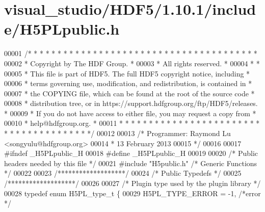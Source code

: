\hypertarget{visual__studio_2_h_d_f5_21_810_81_2include_2_h5_p_lpublic_8h_source}{}\section{visual\+\_\+studio/\+H\+D\+F5/1.10.1/include/\+H5\+P\+Lpublic.h}
\label{visual__studio_2_h_d_f5_21_810_81_2include_2_h5_p_lpublic_8h_source}

\begin{DoxyCode}
00001 \textcolor{comment}{/* * * * * * * * * * * * * * * * * * * * * * * * * * * * * * * * * * * * * * *}
00002 \textcolor{comment}{ * Copyright by The HDF Group.                                               *}
00003 \textcolor{comment}{ * All rights reserved.                                                      *}
00004 \textcolor{comment}{ *                                                                           *}
00005 \textcolor{comment}{ * This file is part of HDF5. The full HDF5 copyright notice, including      *}
00006 \textcolor{comment}{ * terms governing use, modification, and redistribution, is contained in    *}
00007 \textcolor{comment}{ * the COPYING file, which can be found at the root of the source code       *}
00008 \textcolor{comment}{ * distribution tree, or in https://support.hdfgroup.org/ftp/HDF5/releases.  *}
00009 \textcolor{comment}{ * If you do not have access to either file, you may request a copy from     *}
00010 \textcolor{comment}{ * help@hdfgroup.org.                                                        *}
00011 \textcolor{comment}{ * * * * * * * * * * * * * * * * * * * * * * * * * * * * * * * * * * * * * * */}
00012 
00013 \textcolor{comment}{/* Programmer:  Raymond Lu <songyulu@hdfgroup.org>}
00014 \textcolor{comment}{ *              13 February 2013}
00015 \textcolor{comment}{ */}
00016 
00017 \textcolor{preprocessor}{#ifndef \_H5PLpublic\_H}
00018 \textcolor{preprocessor}{#define \_H5PLpublic\_H}
00019 
00020 \textcolor{comment}{/* Public headers needed by this file */}
00021 \textcolor{preprocessor}{#include "H5public.h"}          \textcolor{comment}{/* Generic Functions                    */}
00022 
00023 \textcolor{comment}{/*******************/}
00024 \textcolor{comment}{/* Public Typedefs */}
00025 \textcolor{comment}{/*******************/}
00026 
00027 \textcolor{comment}{/* Plugin type used by the plugin library */}
00028 \textcolor{keyword}{typedef} \textcolor{keyword}{enum} H5PL\_type\_t \{
00029     H5PL\_TYPE\_ERROR        = -1,  \textcolor{comment}{/*error                    */}

\end{DoxyCode}

